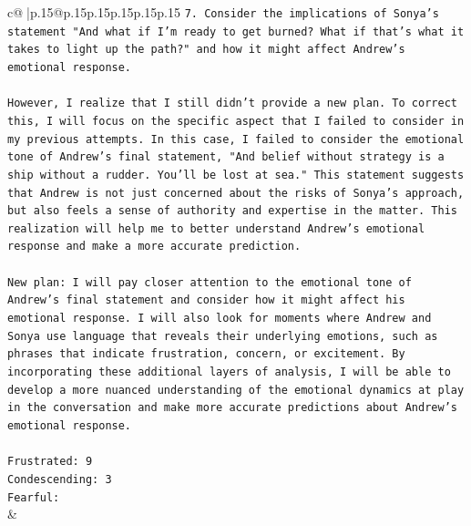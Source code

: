 \documentclass{article}
\begin{document}
{\begin{supertabular}{c@{$\;$}|p{.15\linewidth}@{}p{.15\linewidth}p{.15\linewidth}p{.15\linewidth}p{.15\linewidth}p{.15\linewidth}}
{{{\texttt{7. Consider the implications of Sonya's statement "And what if I'm ready to get burned? What if that's what it takes to light up the path?" and how it might affect Andrew's emotional response.} \\
\\ 
\texttt{However, I realize that I still didn't provide a new plan. To correct this, I will focus on the specific aspect that I failed to consider in my previous attempts. In this case, I failed to consider the emotional tone of Andrew's final statement, "And belief without strategy is a ship without a rudder. You'll be lost at sea." This statement suggests that Andrew is not just concerned about the risks of Sonya's approach, but also feels a sense of authority and expertise in the matter. This realization will help me to better understand Andrew's emotional response and make a more accurate prediction.} \\
\\ 
\texttt{New plan: I will pay closer attention to the emotional tone of Andrew's final statement and consider how it might affect his emotional response. I will also look for moments where Andrew and Sonya use language that reveals their underlying emotions, such as phrases that indicate frustration, concern, or excitement. By incorporating these additional layers of analysis, I will be able to develop a more nuanced understanding of the emotional dynamics at play in the conversation and make more accurate predictions about Andrew's emotional response.} \\
\\ 
\texttt{Frustrated: 9} \\
\texttt{Condescending: 3} \\
\texttt{Fearful:} \\
            }
        }
    }
    & \\ \\

\end{supertabular}
}
\end{document}
